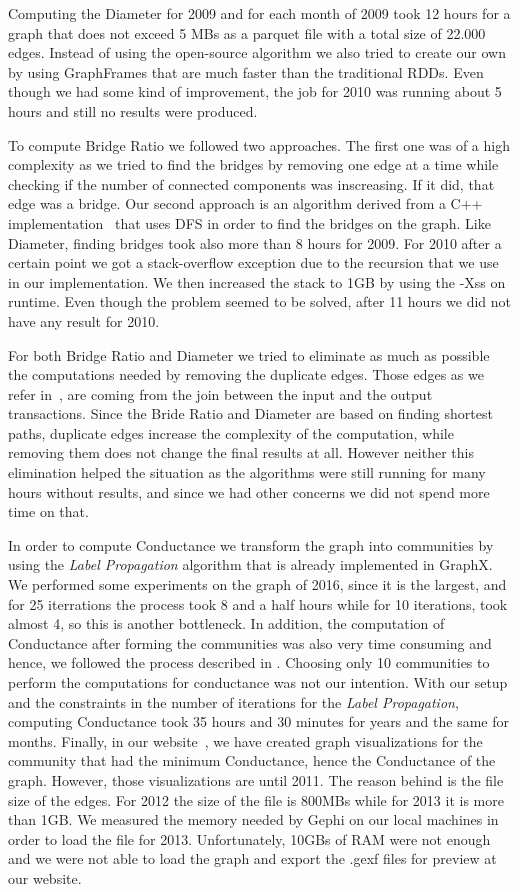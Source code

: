 Computing the Diameter for 2009 and for each month of 2009 took 12 hours for a graph that does not exceed 5 MBs as a parquet file with a total size of 22.000 edges. Instead of using the open-source algorithm we also tried to create our own by using GraphFrames that are much faster than the traditional RDDs. Even though we had some kind of improvement, the job for 2010 was running about 5 hours and still no results were produced. 

To compute Bridge Ratio we followed two approaches. The first one was of a high complexity as we tried to find the bridges by removing one edge at a time while checking if the number of connected components was inscreasing. If it did, that edge was a bridge. Our second approach is an algorithm derived from a C++ implementation~\cite{geeksForGeeks} that uses DFS in order to find the bridges on the graph. Like Diameter, finding bridges took also more than 8 hours for 2009. For 2010 after a certain point we got a stack-overflow exception due to the recursion that we use in our implementation. We then increased the stack to 1GB by using the -Xss on runtime. Even though the problem seemed to be solved, after 11 hours we did not have any result for 2010.


For both Bridge Ratio and Diameter we tried to eliminate as much as possible the computations needed by removing the duplicate edges. Those edges as we refer in~, are coming from the join between the input and the output transactions. Since the Bride Ratio and Diameter are based on finding shortest paths, duplicate edges increase the complexity of the computation, while removing them does not change the final results at all. However neither this elimination helped the situation as the algorithms were still running for many hours without results, and since we had other concerns we did not spend more time on that.

In order to compute Conductance we transform the graph into communities by using the \textit{Label Propagation} algorithm that is already implemented in GraphX. We performed some experiments on the graph of 2016, since it is the largest, and for 25 iterrations the process took 8 and a half hours while for 10 iterations, took almost 4, so this is another bottleneck. In addition, the computation of Conductance after forming the communities was also very time consuming and hence, we followed the process described in . Choosing only 10 communities to perform the computations for conductance was not our intention. With our setup and the constraints in the number of iterations for the \textit{Label Propagation}, computing Conductance took 35 hours and 30 minutes for years and the same for months. Finally, in our website~\cite{website}, we have created graph visualizations for the community that had the minimum Conductance, hence the Conductance of the graph. However, those visualizations are until 2011. The reason behind is the file size of the edges. For 2012 the size of the file is 800MBs while for 2013 it is more than 1GB. We measured the memory needed by Gephi on our local machines in order to load the file for 2013. Unfortunately, 10GBs of RAM were not enough and we were not able to load the graph and export the .gexf files for preview at our website.